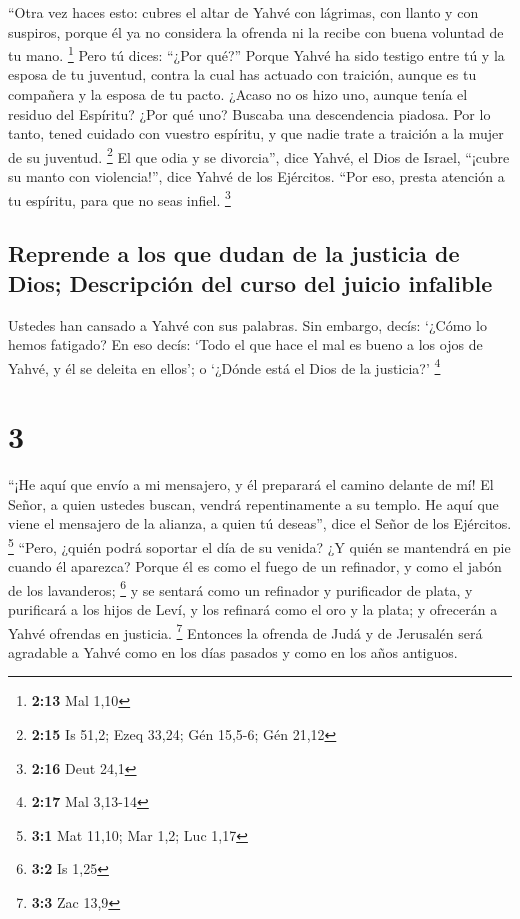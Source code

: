 ``Otra vez haces esto: cubres el altar de Yahvé con
lágrimas, con llanto y con suspiros, porque él ya no considera la
ofrenda ni la recibe con buena voluntad de tu mano. \footnote{\textbf{2:13}
  Mal 1,10}  Pero tú dices: ``¿Por qué?'' Porque Yahvé ha
sido testigo entre tú y la esposa de tu juventud, contra la cual has
actuado con traición, aunque es tu compañera y la esposa de tu pacto.
 ¿Acaso no os hizo uno, aunque tenía el residuo del
Espíritu? ¿Por qué uno? Buscaba una descendencia piadosa. Por lo tanto,
tened cuidado con vuestro espíritu, y que nadie trate a traición a la
mujer de su juventud. \footnote{\textbf{2:15} Is 51,2; Ezeq 33,24; Gén
  15,5-6; Gén 21,12}  El que odia y se divorcia'', dice
Yahvé, el Dios de Israel, ``¡cubre su manto con violencia!'', dice Yahvé
de los Ejércitos. ``Por eso, presta atención a tu espíritu, para que no
seas infiel. \footnote{\textbf{2:16} Deut 24,1}

\hypertarget{reprende-a-los-que-dudan-de-la-justicia-de-dios-descripciuxf3n-del-curso-del-juicio-infalible}{%
\subsection{Reprende a los que dudan de la justicia de Dios; Descripción
del curso del juicio
infalible}\label{reprende-a-los-que-dudan-de-la-justicia-de-dios-descripciuxf3n-del-curso-del-juicio-infalible}}

 Ustedes han cansado a Yahvé con sus palabras. Sin
embargo, decís: `¿Cómo lo hemos fatigado? En eso decís: `Todo el que
hace el mal es bueno a los ojos de Yahvé, y él se deleita en ellos'; o
`¿Dónde está el Dios de la justicia?' \footnote{\textbf{2:17} Mal
  3,13-14}

\hypertarget{section-2}{%
\section{3}\label{section-2}}

 ``¡He aquí que envío a mi mensajero, y él preparará el
camino delante de mí! El Señor, a quien ustedes buscan, vendrá
repentinamente a su templo. He aquí que viene el mensajero de la
alianza, a quien tú deseas'', dice el Señor de los Ejércitos.
\footnote{\textbf{3:1} Mat 11,10; Mar 1,2; Luc 1,17} 
``Pero, ¿quién podrá soportar el día de su venida? ¿Y quién se mantendrá
en pie cuando él aparezca? Porque él es como el fuego de un refinador, y
como el jabón de los lavanderos; \footnote{\textbf{3:2} Is 1,25}
 y se sentará como un refinador y purificador de plata, y
purificará a los hijos de Leví, y los refinará como el oro y la plata; y
ofrecerán a Yahvé ofrendas en justicia. \footnote{\textbf{3:3} Zac 13,9}
 Entonces la ofrenda de Judá y de Jerusalén será agradable
a Yahvé como en los días pasados y como en los años antiguos.

